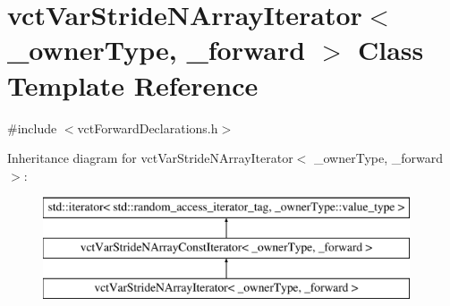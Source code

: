\hypertarget{classvct_var_stride_n_array_iterator}{\section{vct\-Var\-Stride\-N\-Array\-Iterator$<$ \-\_\-owner\-Type, \-\_\-forward $>$ Class Template Reference}
\label{classvct_var_stride_n_array_iterator}
}


{\ttfamily \#include $<$vct\-Forward\-Declarations.\-h$>$}

Inheritance diagram for vct\-Var\-Stride\-N\-Array\-Iterator$<$ \-\_\-owner\-Type, \-\_\-forward $>$\-:\begin{figure}[H]
\begin{center}
\leavevmode
\includegraphics[height=3.000000cm]{dd/dc1/classvct_var_stride_n_array_iterator}
\end{center}
\end{figure}
